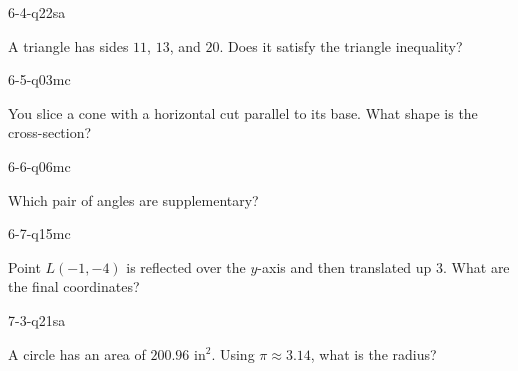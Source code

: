 \begin{practiceQuestion}{6-4-q22}{sa}
\begin{questionText}
A triangle has sides $11$, $13$, and $20$. Does it satisfy the triangle inequality?
\end{questionText}
\end{practiceQuestion}

\begin{practiceQuestion}{6-5-q03}{mc}
\begin{questionText}
You slice a cone with a horizontal cut parallel to its base. What shape is the cross-section?
\end{questionText}
\end{practiceQuestion}

\begin{practiceQuestion}{6-6-q06}{mc}
\begin{questionText}
Which pair of angles are supplementary?
\end{questionText}
\end{practiceQuestion}

\begin{practiceQuestion}{6-7-q15}{mc}
\begin{questionText}
Point $L(-1, -4)$ is reflected over the $y$-axis and then translated up $3$. What are the final coordinates?
\end{questionText}
\end{practiceQuestion}

\begin{practiceQuestion}{7-3-q21}{sa}
\begin{questionText}
A circle has an area of $200.96$ in$^2$. Using $\pi \approx 3.14$, what is the radius?
\end{questionText}
\end{practiceQuestion}

